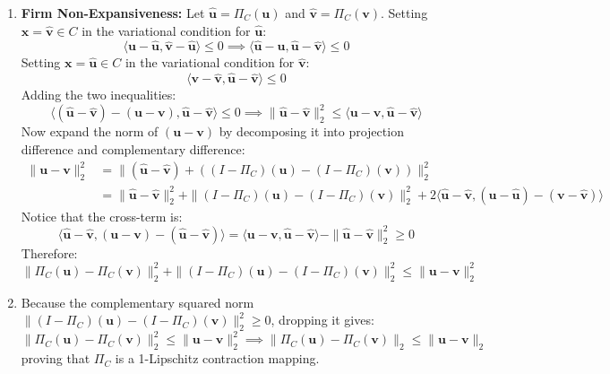\begin{enumerate}[label=(\alph*)]
    \item \textbf{Firm Non-Expansiveness:} Let $\hat{\mathbf{u}} = \Pi_C(\mathbf{u})$ and $\hat{\mathbf{v}} = \Pi_C(\mathbf{v})$. Setting $\mathbf{x} = \hat{\mathbf{v}} \in C$ in the variational condition for $\hat{\mathbf{u}}$:
    \begin{equation*}
    \langle \mathbf{u} - \hat{\mathbf{u}}, \hat{\mathbf{v}} - \hat{\mathbf{u}} \rangle \le 0 \implies \langle \hat{\mathbf{u}} - \mathbf{u}, \hat{\mathbf{u}} - \hat{\mathbf{v}} \rangle \le 0
    \end{equation*}
    Setting $\mathbf{x} = \hat{\mathbf{u}} \in C$ in the variational condition for $\hat{\mathbf{v}}$:
    \begin{equation*}
    \langle \mathbf{v} - \hat{\mathbf{v}}, \hat{\mathbf{u}} - \hat{\mathbf{v}} \rangle \le 0
    \end{equation*}
    Adding the two inequalities:
    \begin{equation*}
    \langle (\hat{\mathbf{u}} - \hat{\mathbf{v}}) - (\mathbf{u} - \mathbf{v}), \hat{\mathbf{u}} - \hat{\mathbf{v}} \rangle \le 0 \implies \|\hat{\mathbf{u}} - \hat{\mathbf{v}}\|_2^2 \le \langle \mathbf{u} - \mathbf{v}, \hat{\mathbf{u}} - \hat{\mathbf{v}} \rangle
    \end{equation*}
    Now expand the norm of $(\mathbf{u} - \mathbf{v})$ by decomposing it into projection difference and complementary difference:
    \begin{align*}
    \|\mathbf{u} - \mathbf{v}\|_2^2 &= \|(\hat{\mathbf{u}} - \hat{\mathbf{v}}) + ((I - \Pi_C)(\mathbf{u}) - (I - \Pi_C)(\mathbf{v}))\|_2^2 \\
    &= \|\hat{\mathbf{u}} - \hat{\mathbf{v}}\|_2^2 + \|(I - \Pi_C)(\mathbf{u}) - (I - \Pi_C)(\mathbf{v})\|_2^2 + 2\langle \hat{\mathbf{u}} - \hat{\mathbf{v}}, (\mathbf{u} - \hat{\mathbf{u}}) - (\mathbf{v} - \hat{\mathbf{v}}) \rangle
    \end{align*}
    Notice that the cross-term is:
    \begin{equation*}
    \langle \hat{\mathbf{u}} - \hat{\mathbf{v}}, (\mathbf{u} - \mathbf{v}) - (\hat{\mathbf{u}} - \hat{\mathbf{v}}) \rangle = \langle \mathbf{u} - \mathbf{v}, \hat{\mathbf{u}} - \hat{\mathbf{v}} \rangle - \|\hat{\mathbf{u}} - \hat{\mathbf{v}}\|_2^2 \ge 0
    \end{equation*}
    Therefore:
    \begin{equation*}
    \|\Pi_C(\mathbf{u}) - \Pi_C(\mathbf{v})\|_2^2 + \|(I - \Pi_C)(\mathbf{u}) - (I - \Pi_C)(\mathbf{v})\|_2^2 \le \|\mathbf{u} - \mathbf{v}\|_2^2
    \end{equation*}
    \item Because the complementary squared norm $\|(I - \Pi_C)(\mathbf{u}) - (I - \Pi_C)(\mathbf{v})\|_2^2 \ge 0$, dropping it gives:
    \begin{equation*}
    \|\Pi_C(\mathbf{u}) - \Pi_C(\mathbf{v})\|_2^2 \le \|\mathbf{u} - \mathbf{v}\|_2^2 \implies \|\Pi_C(\mathbf{u}) - \Pi_C(\mathbf{v})\|_2 \le \|\mathbf{u} - \mathbf{v}\|_2
    \end{equation*}
    proving that $\Pi_C$ is a 1-Lipschitz contraction mapping.
\end{enumerate}

